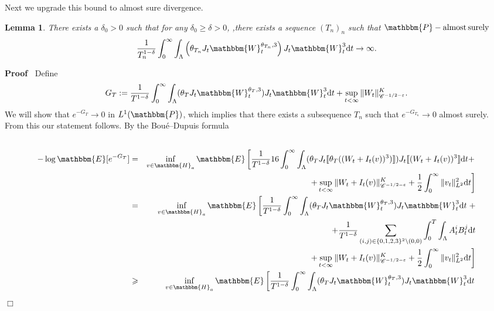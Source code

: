\documentclass[11pt]{article}
\newcommand{\assign}{:=}
\newcommand{\mathd}{\mathrm{d}}
\newcommand{\tmop}[1]{\ensuremath{\operatorname{#1}}}
\newenvironment{proof}{\noindent\textbf{Proof\ }}{\hspace*{\fill}$\Box$\medskip}
\newtheorem{lemma}{Lemma}
\newcommand{\VV}{\mathscr{C}}
\begin{document}
Next we upgrade this bound to almost sure divergence.

\begin{lemma}
  There exists a $\delta_0 > 0$ such that for any $\delta_0 \geqslant \delta >
  0$, ,there exists a sequence $(T_n)_n$ such that $\mathbbm{P}- \tmop{almost}
  \tmop{surely}$
  \[ \frac{1}{T_n^{1 - \delta}} \int^{\infty}_0 \int_{\Lambda} \left(
     \theta_{T_n} J_t \mathbbm{W}_t^{\theta_{T_n}, 3} \right) J_t
     \mathbbm{W}_t^3 \mathd t \rightarrow \infty . \]
\end{lemma}

\begin{proof}
  Define
  \[ G_T \assign \frac{1}{T^{1 - \delta}} \int^{\infty}_0 \int_{\Lambda}
     (\theta_T J_t \mathbbm{W}_t^{\theta_T, 3}) J_t \mathbbm{W}_t^3 \mathd t +
     \sup_{t < \infty} \| W_t \|^K_{\VV^{- 1 / 2 - \varepsilon}} . \]
  We will show that $e^{- G_T} \rightarrow 0$ in $L^1 (\mathbbm{P})$, which
  implies that there exists a subsequence $T_n$ such that $e^{- G_{T_n}}
  \rightarrow 0$ almost surely. From this our statement follows. By the
  Bou{\'e}--Dupuis formula
  \begin{eqnarray*}
    &  & \\
    - \log \mathbbm{E} [e^{- G_T}] & = & \inf_{v \in \mathbbm{H}_a}
    \mathbbm{E} \left[ \frac{1}{T^{1 - \delta}} 16 \int^{\infty}_0
    \int_{\Lambda} (\theta_T J_t \llbracket \theta_T ((W_t + I_t (v))^3)
    \rrbracket) J_t \llbracket (W_t + I_t (v))^3 \rrbracket \mathd t +
    \right.\\
    &  & \qquad \qquad \left. + \sup_{t < \infty} \| W_t + I_t (v)
    \|^K_{\VV^{- 1 / 2 - \varepsilon}} + \frac{1}{2} \int^{\infty}_0 \| v_t
    \|^2_{L^2} \mathd t \right]\\
    & = & \inf_{v \in \mathbbm{H}_a} \mathbbm{E} \left[ \frac{1}{T^{1 -
    \delta}} \int^{\infty}_0 \int_{\Lambda} (\theta_T J_t
    \mathbbm{W}_t^{\theta_T, 3}) J_t \mathbbm{W}_t^3 \mathd t \right. +\\
    &  & \qquad \qquad + \frac{1}{T^{1 - \delta}} \sum_{(i, j) \in \{ 0, 1,
    2, 3 \}^2 \setminus (0, 0)} \int^T_0 \int_{\Lambda} A_t^i B_t^j \mathd t\\
    &  & \qquad \qquad \left. + \sup_{t < \infty} \| W_t + I_t (v)
    \|^K_{\VV^{- 1 / 2 - \varepsilon}} + \frac{1}{2} \int^{\infty}_0 \| v_t
    \|^2_{L^2} \mathd t \right]\\
    & \geqslant & \inf_{v \in \mathbbm{H}_a} \mathbbm{E} \left[ \frac{1}{T^{1
    - \delta}} \int^{\infty}_0 \int_{\Lambda} (\theta_T J_t
    \mathbbm{W}_t^{\theta_T, 3}) J_t \mathbbm{W}_t^3 \mathd t \right.\\

\end{eqnarray*}
\end{proof}
\end{document}

